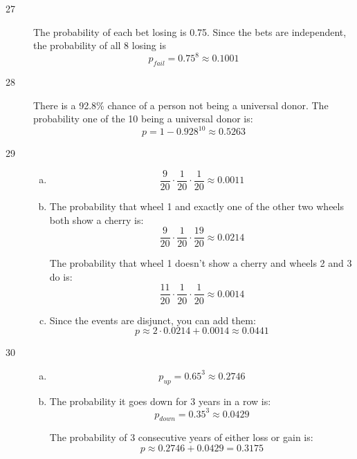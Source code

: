 \documentclass[letterpaper, landscape]{exam}
\begin{document}
  \begin{description}

    \item[27] 
      The probability of each bet losing is 0.75. Since the bets are
      independent, the probability of all 8 losing is
      \[
        p_{fail} = 0.75^8 \approx \boxed{ 0.1001 }
      \]

    \item[28]
      There is a 92.8\% chance of a person not being a universal donor. The
      probability one of the 10 being a universal donor is:
      \[
        p = 1 - 0.928^{10} \approx \boxed{ 0.5263 }
      \]

    \item[29]
      \begin{enumerate}[(a)]
        \item 
          \[
            \frac{9}{20} \cdot \frac{1}{20} \cdot \frac{1}{20} 
              \approx \boxed{ 0.0011 }
          \]

        \item
            The probability that wheel 1 and exactly one of the other two
            wheels both show a cherry is:
            \[
              \frac{9}{20} \cdot \frac{1}{20} \cdot \frac{19}{20} 
                \approx \boxed{ 0.0214 }
            \]

            The probability that wheel 1 doesn't show a cherry and wheels 2 and 3 
            do is:
            \[
              \frac{11}{20} \cdot \frac{1}{20} \cdot \frac{1}{20} 
                \approx \boxed{ 0.0014 }
            \]

          \item
            Since the events are disjunct, you can add them:
            \[
              p \approx 2 \cdot 0.0214 + 0.0014 \approx \boxed{ 0.0441 } 
            \]
      \end{enumerate}

    \item[30]
      \begin{enumerate}[(a)]
        \item 
          \[
            p_{up} = 0.65^3 \approx \boxed{ 0.2746 }
          \]

        \item 
          The probability it goes down for 3 years in a row is:
          \[
            p_{down} = 0.35^3 \approx 0.0429
          \]

          The probability of 3 consecutive years of either loss or gain is:
          \[
            p \approx 0.2746 + 0.0429 = \boxed{ 0.3175 }
          \]


\end{enumerate}
\end{description}
\end{document}
